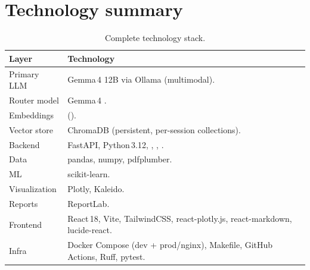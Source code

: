 \section{Technology summary}
\label{app:tech}
\begin{table}[h]
\centering
\caption{Complete technology stack.}
\small
\begin{tabularx}{\linewidth}{@{}L{3.2cm} X@{}}
\toprule
\textbf{Layer} & \textbf{Technology} \\
\midrule
Primary LLM & Gemma\,4 12B via Ollama (multimodal). \\
Router model & Gemma\,4 . \\
Embeddings &  (). \\
Vector store & ChromaDB (persistent, per-session collections). \\
Backend & FastAPI, Python\,3.12, , ,
. \\
Data & pandas, numpy, pdfplumber. \\
ML & scikit-learn. \\
Visualization & Plotly, Kaleido. \\
Reports & ReportLab. \\
Frontend & React\,18, Vite, TailwindCSS, react-plotly.js, react-markdown,
lucide-react. \\
Infra & Docker Compose (dev + prod/nginx), Makefile, GitHub Actions, Ruff,
pytest. \\
\bottomrule
\end{tabularx}
\end{table}

